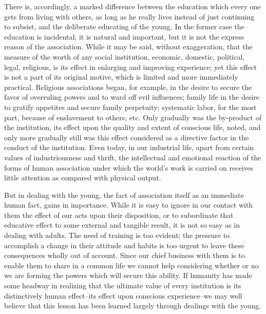 \bigskip
\begin{linenumbers}
\modulolinenumbers[5]
\indent There is, accordingly, a marked difference between the education which every one gets from living with others, as long as he really lives instead of just continuing to subsist, and the deliberate educating of the young. In the former case the education is incidental; it is natural and important, but it is not the express reason of the association. While it may be said, without exaggeration, that the measure of the worth of any social institution, economic, domestic, political, legal, religious, is its effect in enlarging and improving experience; yet this effect is not a part of its original motive, which is limited and more immediately practical. Religious associations began, for example, in the desire to secure the favor of overruling powers and to ward off evil influences; family life in the desire to gratify appetites and secure family perpetuity; systematic labor, for the most part, because of enslavement to others, etc. Only gradually was the by-product of the institution, its effect upon the quality and extent of conscious life, noted, and only more gradually still was this effect considered as a directive factor in the conduct of the institution. Even today, in our industrial life, apart from certain values of industriousness and thrift, the intellectual and emotional reaction of the forms of human association under which the world's work is carried on receives little attention as compared with physical output.

\indent But in dealing with the young, the fact of association itself as an immediate human fact, gains in importance. While it is easy to ignore in our contact with them the effect of our acts upon their disposition, or to subordinate that educative effect to some external and tangible result, it is not so easy as in dealing with adults. The need of training is too evident; the pressure to accomplish a change in their attitude and habits is too urgent to leave these consequences wholly out of account. Since our chief business with them is to enable them to share in a common life we cannot help considering whether or no we are forming the powers which will secure this ability. If humanity has made some headway in realizing that the ultimate value of every institution is its distinctively human effect--its effect upon conscious experience--we may well believe that this lesson has been learned largely through dealings with the young.


\end{linenumbers}
